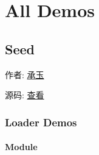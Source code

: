 \documentclass[letterpaper,10pt,english]{sphinxmanual}
\begin{document}
\chapter{All Demos}
\label{demo/index:demo}\label{demo/index::doc}\label{demo/index:all-demos}

\section{Seed}
\label{demo/seed/index:seed-demo}\label{demo/seed/index:seed}\label{demo/seed/index::doc}
\begin{DUlineblock}{0em}
\item[] 作者: \href{mailto:yiminghe@gmail.com}{承玉}
\item[] 源码: \href{https://github.com/kissyteam/kissy/tree/master/src/seed}{查看}
\end{DUlineblock}


\subsection{Loader Demos}
\label{demo/seed/loader/index:loader-demos}\label{demo/seed/loader/index::doc}

\subsubsection{Module}
\label{demo/seed/loader/index:module}\begin{quote}

{\hyperref[api/seed/loader/index:module-Loader]{}}
\end{quote}
\end{document}
